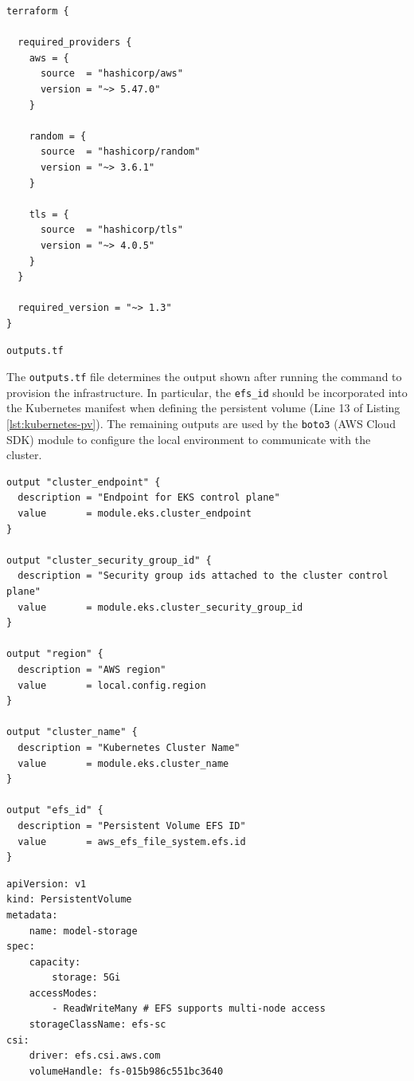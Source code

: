 \begin{lstlisting}[xleftmargin=10pt, caption={\texttt{terraform.tf} source code}]
terraform {

  required_providers {
    aws = {
      source  = "hashicorp/aws"
      version = "~> 5.47.0"
    }

    random = {
      source  = "hashicorp/random"
      version = "~> 3.6.1"
    }

    tls = {
      source  = "hashicorp/tls"
      version = "~> 4.0.5"
    }
  }

  required_version = "~> 1.3"
}
\end{lstlisting}

\texttt{outputs.tf}

The \texttt{outputs.tf} file determines the output shown after running the command to provision the infrastructure. In particular, 
the \texttt{efs\_id} should be incorporated into the Kubernetes manifest when defining the persistent volume (Line 13 of Listing \ref{lst:kubernetes-pv}). 
The remaining outputs are used by the \texttt{boto3} (AWS Cloud SDK) module to configure the local environment to communicate with the 
cluster.

\begin{lstlisting}[xleftmargin=10pt, caption={\texttt{outputs.tf} source code}]
output "cluster_endpoint" {
  description = "Endpoint for EKS control plane"
  value       = module.eks.cluster_endpoint
}

output "cluster_security_group_id" {
  description = "Security group ids attached to the cluster control plane"
  value       = module.eks.cluster_security_group_id
}

output "region" {
  description = "AWS region"
  value       = local.config.region
}

output "cluster_name" {
  description = "Kubernetes Cluster Name"
  value       = module.eks.cluster_name
}

output "efs_id" {
  description = "Persistent Volume EFS ID"
  value       = aws_efs_file_system.efs.id
}

\end{lstlisting}

\begin{lstlisting}[xleftmargin=10pt, caption={Definition of Kubernetes Persistent Volume for ASR Application}, label={lst:kubernetes-pv}]
apiVersion: v1
kind: PersistentVolume
metadata:
    name: model-storage
spec:
    capacity:
        storage: 5Gi
    accessModes:
        - ReadWriteMany # EFS supports multi-node access
    storageClassName: efs-sc
csi:
    driver: efs.csi.aws.com
    volumeHandle: fs-015b986c551bc3640
\end{lstlisting}

